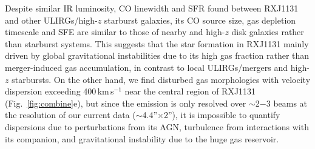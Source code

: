 \documentclass[11pt,a4paper,twoside,graphicx,color]{article}
\newcommand{\kms}{km\,s$^{-1}$\xspace}
\newcommand{\Fig}[1]{Fig.~\ref{fig:#1}}
\newcommand{\SF}{star formation\xspace}
\newcommand{\SB}{starburst\xspace}
\newcommand{\highz}{high-$z$\xspace}
\begin{document}
Despite similar IR luminosity, CO linewidth and SFR found between RXJ1131
and other ULIRGs/high-$z$ \SB galaxies,
its CO source size, gas depletion timescale and SFE are similar to those
of nearby and high-$z$ disk galaxies rather than \SB systems. This suggests that
the \SF in RXJ1131
mainly driven by
global gravitational instabilities due to its high gas fraction
rather than merger-induced gas accumulation,
in contrast to local ULIRGs/mergers and \highz starbursts.
On the other hand, we find disturbed gas morphologies with velocity dispersion exceeding
400\,\kms near the central region of RXJ1131 (\Fig{combine}e), but since
the emission is only resolved over $\sim$2$-$3 beams at the resolution of our current data ($\sim$4.4''$\times$2''),
it is impossible to quantify dispersions due to
perturbations from its AGN,
turbulence from interactions with its companion,
and gravitational instability due to the huge gas reservoir. %
\end{document}
